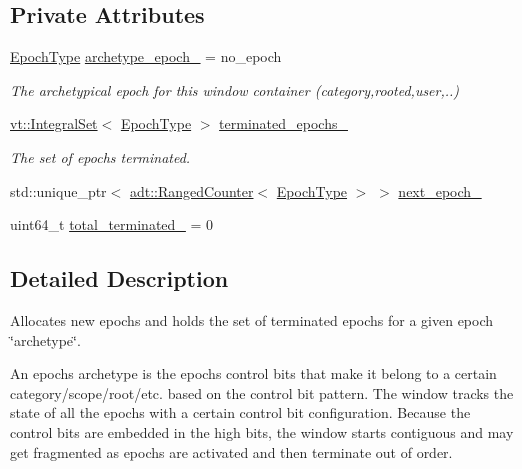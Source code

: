 \subsection*{Private Attributes}
\begin{DoxyCompactItemize}
\item 
\hyperlink{namespacevt_a985a5adf291c34a3ca263b3378388236}{Epoch\+Type} \hyperlink{structvt_1_1epoch_1_1_epoch_window_a74c5c529d1a7fddf5f2d7a5cb9dbe4af}{archetype\+\_\+epoch\+\_\+} = no\+\_\+epoch
\begin{DoxyCompactList}\small\item\em The archetypical epoch for this window container (category,rooted,user,..) \end{DoxyCompactList}\item 
\hyperlink{namespacevt_af8fc7210a3d8e598330cf3375857ef1e}{vt\+::\+Integral\+Set}$<$ \hyperlink{namespacevt_a985a5adf291c34a3ca263b3378388236}{Epoch\+Type} $>$ \hyperlink{structvt_1_1epoch_1_1_epoch_window_ae660a6b6db0f1a90d0922f6c29f0dd28}{terminated\+\_\+epochs\+\_\+}
\begin{DoxyCompactList}\small\item\em The set of epochs terminated. \end{DoxyCompactList}\item 
std\+::unique\+\_\+ptr$<$ \hyperlink{namespacevt_1_1adt_a075b41b03183cb280d453f44d5397637}{adt\+::\+Ranged\+Counter}$<$ \hyperlink{namespacevt_a985a5adf291c34a3ca263b3378388236}{Epoch\+Type} $>$ $>$ \hyperlink{structvt_1_1epoch_1_1_epoch_window_a946a18f109dcae51f347d02c6a700c4e}{next\+\_\+epoch\+\_\+}
\item 
uint64\+\_\+t \hyperlink{structvt_1_1epoch_1_1_epoch_window_a2c33b5bc9f0228eccd15b3788c4b1022}{total\+\_\+terminated\+\_\+} = 0
\end{DoxyCompactItemize}


\subsection{Detailed Description}
Allocates new epochs and holds the set of terminated epochs for a given epoch \char`\"{}archetype\char`\"{}. 

An epoch\textquotesingle{}s archetype is the epoch\textquotesingle{}s control bits that make it belong to a certain category/scope/root/etc. based on the control bit pattern. The window tracks the state of all the epochs with a certain control bit configuration. Because the control bits are embedded in the high bits, the window starts contiguous and may get fragmented as epochs are activated and then terminate out of order. 

